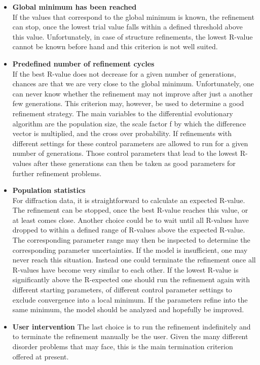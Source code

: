 \begin{itemize}
  \item {\bf Global minimum has been reached}\\
     If the values that correspond to the global minimum is
     known, the refinement can stop, once the lowest trial value falls
     within a defined threshold above this value. Unfortunately, in 
     case of structure refinements, the lowest R-value cannot be known
     before hand and this criterion is not well suited.
  \item {\bf Predefined number of refinement cycles}\\
     If the best R-value does not decrease for a given number of 
     generations, chances are that we are very close to the global minimum.
     Unfortunately, one can never know whether the refinement may not
     improve after just a another few generations. This criterion may, however,
     be used to determine a good refinement strategy. The main variables
     to the differential evolutionary algorithm are the population size, 
     the scale factor f by which the difference vector is multiplied, 
     and the cross over probability. If refinements with different 
     settings for these control parameters are allowed to run for a 
     given number of generations. Those control parameters that lead to
     the lowest R-values after these generations can then be taken as 
     good parameters for further refinement problems.
  \item {\bf Population statistics}\\
     For diffraction data, it is straightforward to calculate an expected
     R-value. The refinement can be stopped, once the best R-value 
     reaches this value, or at least comes close. Another choice could
     be to wait until all R-values have dropped to within a defined 
     range of R-values above the expected R-value. The corresponding
     parameter range may then be inspected to determine the corresponding 
     parameter uncertainties. If the model is insufficient, one may never
     reach this situation. Instead one could terminate the refinement
     once all R-values have become very similar to each other. If the
     lowest R-value is significantly above the R-expected one should 
     run the refinement again with different starting parameters, of 
     different control parameter settings to exclude convergence into a
     local minimum. If the parameters refine into the same minimum, the
     model should be analyzed and hopefully be improved.
  \item {\bf User intervention}
     The last choice is to run the refinement indefinitely and to 
     terminate the refinement manually be the user. Given the many 
     different disorder problems that \Diffev may face, this is the main
     termination criterion offered at present.

\end{itemize}

